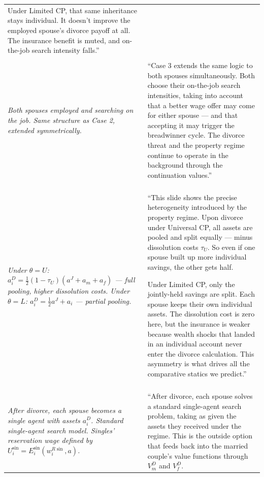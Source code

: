 \documentclass[11pt, a4paper]{article}
\begin{document}
\begin{longtable}{L{6cm} L{10cm}}
Under Limited CP, that same inheritance stays individual. It doesn't improve the employed spouse's divorce payoff at all. The insurance benefit is muted, and on-the-job search intensity falls.'' \\[1em]

\\
\textit{Both spouses employed and searching on the job.
Same structure as Case 2, extended symmetrically.} &
``Case 3 extends the same logic to both spouses simultaneously. Both choose their on-the-job search intensities, taking into account that a better wage offer may come for either spouse — and that accepting it may trigger the breadwinner cycle. The divorce threat and the property regime continue to operate in the background through the continuation values.'' \\[1em]

\\
\textit{Under $\theta = U$: $a_i^D = \frac{1}{2}(1-\tau_U)(a^J + a_m + a_f)$ — full pooling, higher dissolution costs.
Under $\theta = L$: $a_i^D = \frac{1}{2}a^J + a_i$ — partial pooling.} &
``This slide shows the precise heterogeneity introduced by the property regime. Upon divorce under Universal CP, all assets are pooled and split equally — minus dissolution costs $\tau_U$. So even if one spouse built up more individual savings, the other gets half.

Under Limited CP, only the jointly-held savings are split. Each spouse keeps their own individual assets. The dissolution cost is zero here, but the insurance is weaker because wealth shocks that landed in an individual account never enter the divorce calculation. This asymmetry is what drives all the comparative statics we predict.'' \\[1em]

\\
\textit{After divorce, each spouse becomes a single agent with assets $a_i^D$.
Standard single-agent search model.
Singles' reservation wage defined by $U_i^{\sin} = E_i^{\sin}(w_i^{R\sin}, a)$.} &
``After divorce, each spouse solves a standard single-agent search problem, taking as given the assets they received under the regime. This is the outside option that feeds back into the married couple's value functions through $V_m^D$ and $V_f^D$.


\end{longtable}
\end{document}
